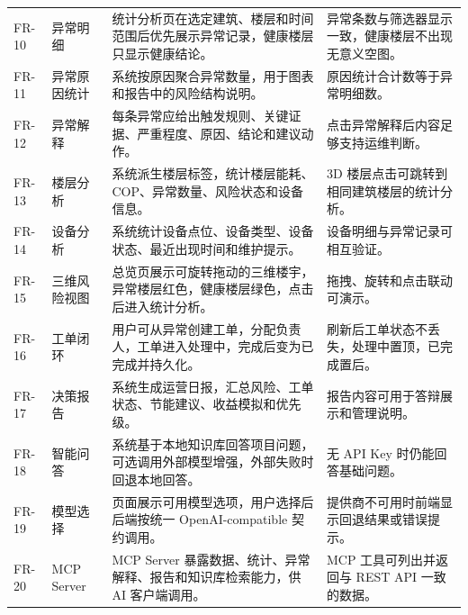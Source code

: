 \documentclass[12pt,a4paper]{ctexart}
\begin{document}
\begin{longtable}{L{1.7cm}L{2.8cm}L{6.2cm}L{4.5cm}}
FR-10 & 异常明细 & 统计分析页在选定建筑、楼层和时间范围后优先展示异常记录，健康楼层只显示健康结论。 & 异常条数与筛选器显示一致，健康楼层不出现无意义空图。 \\
FR-11 & 异常原因统计 & 系统按原因聚合异常数量，用于图表和报告中的风险结构说明。 & 原因统计合计数等于异常明细数。 \\
FR-12 & 异常解释 & 每条异常应给出触发规则、关键证据、严重程度、原因、结论和建议动作。 & 点击异常解释后内容足够支持运维判断。 \\
FR-13 & 楼层分析 & 系统派生楼层标签，统计楼层能耗、COP、异常数量、风险状态和设备信息。 & 3D 楼层点击可跳转到相同建筑楼层的统计分析。 \\
FR-14 & 设备分析 & 系统统计设备点位、设备类型、设备状态、最近出现时间和维护提示。 & 设备明细与异常记录可相互验证。 \\
FR-15 & 三维风险视图 & 总览页展示可旋转拖动的三维楼宇，异常楼层红色，健康楼层绿色，点击后进入统计分析。 & 拖拽、旋转和点击联动可演示。 \\
FR-16 & 工单闭环 & 用户可从异常创建工单，分配负责人，工单进入处理中，完成后变为已完成并持久化。 & 刷新后工单状态不丢失，处理中置顶，已完成置后。 \\
FR-17 & 决策报告 & 系统生成运营日报，汇总风险、工单状态、节能建议、收益模拟和优先级。 & 报告内容可用于答辩展示和管理说明。 \\
FR-18 & 智能问答 & 系统基于本地知识库回答项目问题，可选调用外部模型增强，外部失败时回退本地回答。 & 无 API Key 时仍能回答基础问题。 \\
FR-19 & 模型选择 & 页面展示可用模型选项，用户选择后后端按统一 OpenAI-compatible 契约调用。 & 提供商不可用时前端显示回退结果或错误提示。 \\
FR-20 & MCP Server & MCP Server 暴露数据、统计、异常解释、报告和知识库检索能力，供 AI 客户端调用。 & MCP 工具可列出并返回与 REST API 一致的数据。 \\
\bottomrule
\end{longtable}
\end{document}
